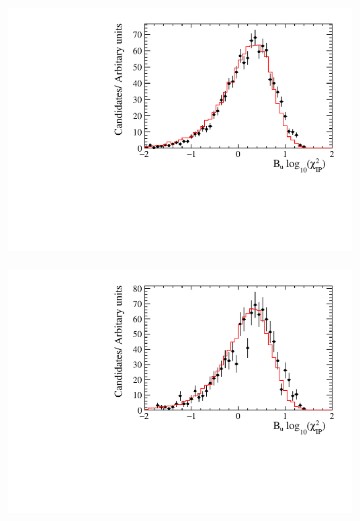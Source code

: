 \begin{figure}[!h]
   \centering
   \begin{subfigure}[t]{0.32\textwidth}
      \centering
      \includegraphics[width=1.0\textwidth]{figs/Selection/Data_MC_Comparison_Var_1_B2DsD0_Ds2KKPi.pdf}
      \caption{\decay{\Dsp}{\Kp\Km\pip}}
   \end{subfigure}
   \begin{subfigure}[t]{0.32\textwidth}
      \centering
      \includegraphics[width=1.0\textwidth]{figs/Selection/Data_MC_Comparison_Var_1_B2DsD0_Ds2PiPiPi.pdf}
      \caption{\decay{\Dsp}{\pip\pim\pip}}
   \end{subfigure}
   \begin{subfigure}[t]{0.32\textwidth}
      \centering

\end{subfigure}
\end{figure}
